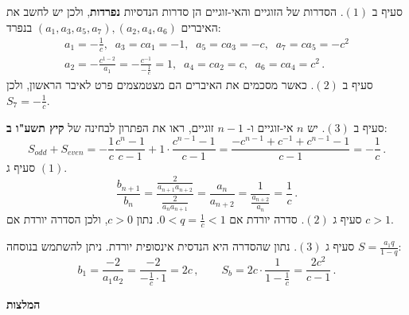 \documentclass[12pt,a4paper]{article}
\begin{document}
סעיף ב
$(1)$.
הסדרות של הזוגיים והאי-זוגיים הן סדרות הנדסיות
\textbf{נפרדות},
ולכן יש לחשב את האיברים
$(a_1,a_3,a_5,a_7), (a_2,a_4,a_6)$
בנפרד:
\[
\renewcommand{\arraystretch}{2}
\begin{array}{l}
a_1=-\displaystyle\frac{1}{c},\;\;a_3=ca_1=-1,\;\;a_5=ca_3=-c,\;\;a_7=ca_5=-c^2\\
a_2=\displaystyle
-\frac{c^{1-2}}{a_1}=
-\frac{c^{-1}}{-\frac{1}{c}}=1,\;\;a_4=ca_2=c,\;\;a_6=ca_4=c^2\,.
\end{array}
\]
סעיף ב
$(2)$.
כאשר מסכמים את האיברים הם מצטמצמים פרט לאיבר הראשון, ולכן
$S_7=-\frac{1}{c}$.

סעיף ב
$(3)$.
יש 
$n$ 
אי-זוגיים ו-%
$n-1$
זוגיים, ראו את הפתרון לבחינה של
\textbf{קיץ תשע"ו ב}:
\[
S_{\mathit{odd}}+S_{\mathit{even}}=-\frac{1}{c}\frac{c^n-1}{c-1}+ 1\cdot\frac{c^{n-1}-1}{c-1}= \frac{-c^{n-1}+c^{-1} + c^{n-1}-1}{c-1}= -\frac{1}{c}\,.
\]
סעיף ג
$(1)$.
\[
\frac{b_{n+1}}{b_n} = \frac{\displaystyle\frac{2}{a_{n+1}a_{n+2}}}{\displaystyle\frac{2}{a_{n}a_{n+1}}}= \frac{a_n}{a_{n+2}} =  \frac{1}{\displaystyle\frac{a_{n+2}}{a_n}} = \frac{1}{c}\,.
\]
סעיף ג
$(2)$.
סדרה יורדת אם
$0<q=\displaystyle\frac{1}{c} < 1$.
נתון
$c>0$,
ולכן הסדרה יורדת אם
$c>1$.

סעיף ג
$(3)$.
נתון שהסדרה היא הנדסית אינסופית יורדת. ניתן להשתמש בנוסחה 
$S=\displaystyle\frac{a_1q}{1-q}$:
\[
b_1=\frac{-2}{a_1a_2}= \frac{-2}{\displaystyle-\frac{1}{c}\cdot 1}=2c\,,\quad\quad
S_b = 2c\cdot\frac{1}{1-\displaystyle\frac{1}{c}}=\frac{2c^2}{c-1}\,.
\]




\newpage

\begin{center}
\textbf{המלצות}
\end{center}
\end{document}
